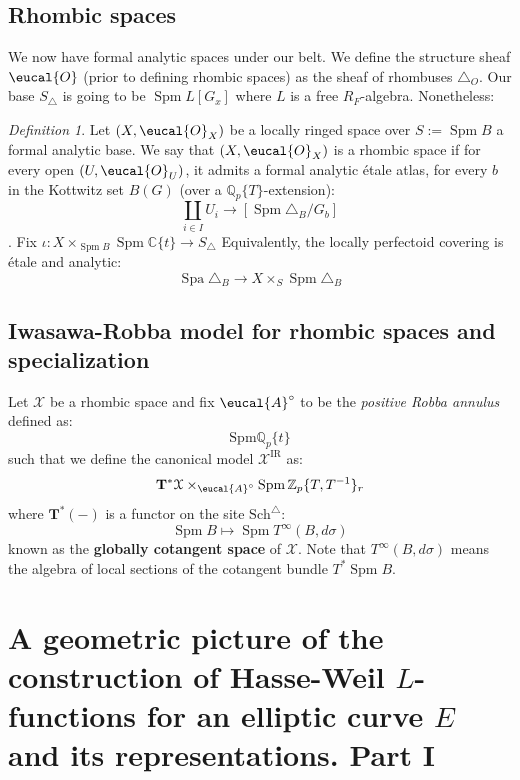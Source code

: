 \documentclass[9pt]{amsart}
\let\texcal\mathcal
\renewcommand{\[}{\begin{equation}}
\renewcommand{\]}{\end{equation}}
\newcommand{\on}{\operatorname}
\theoremstyle{plain}
\theoremstyle{remark}
\newtheorem{defin}[thm]{Definition}
\begin{document}
\subsection{Rhombic spaces} 
We now have formal analytic spaces under our belt. We define the structure sheaf $\eucal{O}$ (prior to defining rhombic spaces) as the sheaf of rhombuses $\triangle_O$. Our base $S_{\triangle}$ is going to be $\on{Spm} L[G_x]$ where $L$ is a free $R_F$-algebra.
Nonetheless:
\begin{defin} Let $(X, \eucal{O}_X)$ be a locally ringed space over $S := \on{Spm} B$ a formal analytic base. We say that $(X, \eucal{O}_X)$ is a rhombic space if for every open $(U, \eucal{O}_U)$, it admits a formal analytic étale atlas, for every $b$ in the Kottwitz set $B(G)$ (over a $\mathbb{Q}_p\{T\}$-extension):
\[\coprod_{i\in I} U_i \to [\on{Spm} \triangle_B/G_{b}]\]. Fix $\iota: X \times_{\on{Spm} B} \on{Spm} \mathbb{C}\{t\} \to S_{\triangle}$
Equivalently, the locally perfectoid covering is étale and analytic:
\[\on{Spa} \triangle_B \to X \times_S \on{Spm} \triangle_B\]
\end{defin}
\subsection{Iwasawa-Robba model for rhombic spaces and specialization}
Let $\texcal{X}$ be a rhombic space and fix $\eucal{A}^{\circ}$ to be the \textit{positive Robba annulus} defined as:
\[\text{Spm} \mathbb{Q}_p\{t\}\]
such that we define the canonical model $\texcal{X}^{\on{IR}}$ as:
\[\mathbf{T}^* \texcal{X} \times_{\eucal{A}^{\circ}} \on{Spm}\mathbb{Z}_p\{T, T^{-1}\}_r\]
where $\mathbf{T}^*(-)$ is a functor on the site $\text{Sch}^{\triangle}$:
\[\on{Spm} B \mapsto \on{Spm}T^{\infty}(B, d\sigma)\] known as the \textbf{globally cotangent space} of $\texcal{X}$. 
Note that $T^{\infty}(B, d\sigma)$ means the algebra of local sections of the cotangent bundle $T^* \on{Spm} B$.
\section{A geometric picture of the construction of Hasse-Weil $L$-functions for an elliptic curve $E$ and its representations. Part I}
\end{document}
